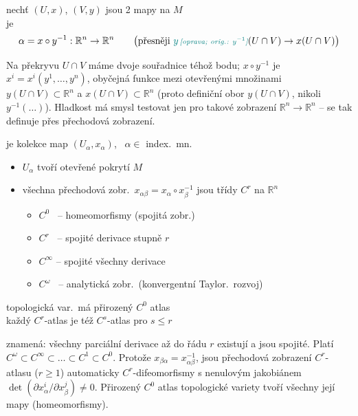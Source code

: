 \begin{definice}
nechť $(U,x)$, $(V,y)$ jsou 2 mapy na $M$ \\
 je
\[ \alpha = x\circ y^{-1}: \mathbb{R}^n\to\mathbb{R}^n
   \qquad \big(\text{přesněji } \oprava{y}{y^{-1}}(U\cap V)\to x(U\cap V)\big) \]
\end{definice}

\begin{vysvetleni}
Na překryvu $U\cap V$ máme dvoje souřadnice téhož bodu; $x\circ y^{-1}$ je  $x^i = x^i(y^1,\dots,y^n)$, obyčejná funkce mezi otevřenými množinami $y(U\cap V)\subset\mathbb{R}^n$ a $x(U\cap V)\subset\mathbb{R}^n$ (proto definiční obor $y(U\cap V)$, nikoli $y^{-1}(\dots)$). Hladkost má smysl testovat jen pro takové zobrazení $\mathbb{R}^n\to\mathbb{R}^n$ --  se tak definuje přes přechodová zobrazení.
\end{vysvetleni}

\begin{definice}
 je kolekce map $(U_\alpha,x_\alpha)$, \ $\alpha\in$ index.\ mn.
\begin{itemize}[nosep]
  \item[--] $U_\alpha$ tvoří otevřené pokrytí $M$
  \item[--] všechna přechodová zobr.\ $x_{\alpha\beta} = x_\alpha\circ x_\beta^{-1}$ jsou třídy $C^r$ na $\mathbb{R}^n$
  \begin{itemize}[nosep]
    \item[] $C^0$ \ -- homeomorfismy (spojitá zobr.)
    \item[] $C^r$ \ -- spojité derivace stupně $r$
    \item[] $C^\infty$ -- spojité všechny derivace
    \item[] $C^\omega$ \ -- analytická zobr.\ (konvergentní Taylor.\ rozvoj)
  \end{itemize}
\end{itemize}
\end{definice}
topologická var.\ má přirozený $C^0$ atlas \\
každý $C^r$-atlas je též $C^s$-atlas pro $s\leq r$

\begin{vysvetleni}
 znamená: všechny parciální derivace až do řádu $r$ existují a jsou spojité. Platí $C^\omega\subset C^\infty\subset\dots\subset C^1\subset C^0$. Protože $x_{\beta\alpha}=x_{\alpha\beta}^{-1}$, jsou přechodová zobrazení $C^r$-atlasu ($r\geq1$) automaticky $C^r$-difeomorfismy s nenulovým jakobiánem $\det(\partial x_\alpha^i/\partial x_\beta^j)\neq0$. Přirozený $C^0$ atlas topologické variety tvoří všechny její mapy (homeomorfismy).
\end{vysvetleni}

